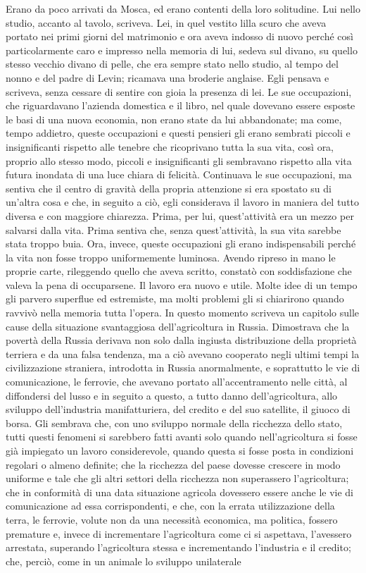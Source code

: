 Erano da poco arrivati da Mosca, ed erano contenti della loro solitudine. Lui nello studio, accanto al tavolo, scriveva. Lei, in quel vestito lilla scuro che aveva portato nei primi giorni del matrimonio e ora aveva indosso di nuovo perché così particolarmente caro e impresso nella memoria di lui, sedeva sul divano, su quello stesso vecchio divano di pelle, che era sempre stato nello studio, al tempo del nonno e del padre di Levin; ricamava una broderie anglaise. Egli pensava e scriveva, senza cessare di sentire con gioia la presenza di lei. Le sue occupazioni, che riguardavano l'azienda domestica e il libro, nel quale dovevano essere esposte le basi di una nuova economia, non erano state da lui abbandonate; ma come, tempo addietro, queste occupazioni e questi pensieri gli erano sembrati piccoli e insignificanti rispetto alle tenebre che ricoprivano tutta la sua vita, così ora, proprio allo stesso modo, piccoli e insignificanti gli sembravano rispetto alla vita futura inondata di una luce chiara di felicità. Continuava le sue occupazioni, ma sentiva che il centro di gravità della propria attenzione si era spostato su di un'altra cosa e che, in seguito a ciò, egli considerava il lavoro in maniera del tutto diversa e con maggiore chiarezza. Prima, per lui, quest'attività era un mezzo per salvarsi dalla vita. Prima sentiva che, senza quest'attività, la sua vita sarebbe stata troppo buia. Ora, invece, queste occupazioni gli erano indispensabili perché la vita non fosse troppo uniformemente luminosa. Avendo ripreso in mano le proprie carte, rileggendo quello che aveva scritto, constatò con soddisfazione che valeva la pena di occuparsene. Il lavoro era nuovo e utile. Molte idee di un tempo gli parvero superflue ed estremiste, ma molti problemi gli si chiarirono quando ravvivò nella memoria tutta l'opera. In questo momento scriveva un capitolo sulle cause della situazione svantaggiosa dell'agricoltura in Russia. Dimostrava che la povertà della Russia derivava non solo dalla ingiusta distribuzione della proprietà terriera e da una falsa tendenza, ma a ciò avevano cooperato negli ultimi tempi la civilizzazione straniera, introdotta in Russia anormalmente, e soprattutto le vie di comunicazione, le ferrovie, che avevano portato all'accentramento nelle città, al diffondersi del lusso e in seguito a questo, a tutto danno dell'agricoltura, allo sviluppo dell'industria manifatturiera, del credito e del suo satellite, il giuoco di borsa. Gli sembrava che, con uno sviluppo normale della ricchezza dello stato, tutti questi fenomeni si sarebbero fatti avanti solo quando nell'agricoltura si fosse già impiegato un lavoro considerevole, quando questa si fosse posta in condizioni regolari o almeno definite; che la ricchezza del paese dovesse crescere in modo uniforme e tale che gli altri settori della ricchezza non superassero l'agricoltura; che in conformità di una data situazione agricola dovessero essere anche le vie di comunicazione ad essa corrispondenti, e che, con la errata utilizzazione della terra, le ferrovie, volute non da una necessità economica, ma politica, fossero premature e, invece di incrementare l'agricoltura come ci si aspettava, l'avessero arrestata, superando l'agricoltura stessa e incrementando l'industria e il credito; che, perciò, come in un animale lo sviluppo unilaterale 